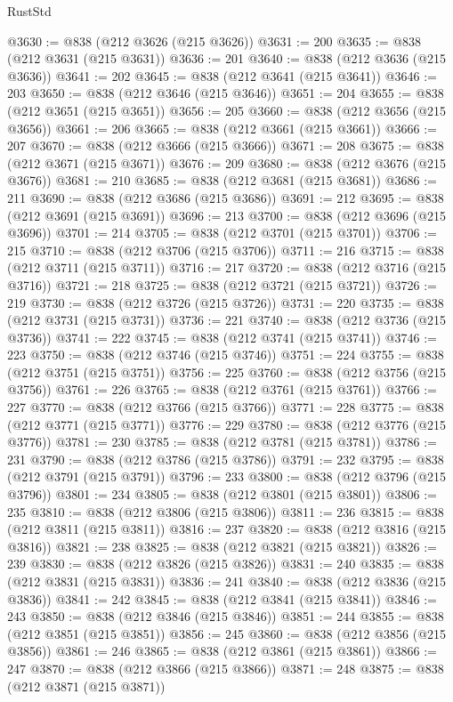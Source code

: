 \begin{lexlean}{RustStd}
\begin{coremodule}
@3630 := @838 (@212 @3626 (@215 @3626))
@3631 := 200
@3635 := @838 (@212 @3631 (@215 @3631))
@3636 := 201
@3640 := @838 (@212 @3636 (@215 @3636))
@3641 := 202
@3645 := @838 (@212 @3641 (@215 @3641))
@3646 := 203
@3650 := @838 (@212 @3646 (@215 @3646))
@3651 := 204
@3655 := @838 (@212 @3651 (@215 @3651))
@3656 := 205
@3660 := @838 (@212 @3656 (@215 @3656))
@3661 := 206
@3665 := @838 (@212 @3661 (@215 @3661))
@3666 := 207
@3670 := @838 (@212 @3666 (@215 @3666))
@3671 := 208
@3675 := @838 (@212 @3671 (@215 @3671))
@3676 := 209
@3680 := @838 (@212 @3676 (@215 @3676))
@3681 := 210
@3685 := @838 (@212 @3681 (@215 @3681))
@3686 := 211
@3690 := @838 (@212 @3686 (@215 @3686))
@3691 := 212
@3695 := @838 (@212 @3691 (@215 @3691))
@3696 := 213
@3700 := @838 (@212 @3696 (@215 @3696))
@3701 := 214
@3705 := @838 (@212 @3701 (@215 @3701))
@3706 := 215
@3710 := @838 (@212 @3706 (@215 @3706))
@3711 := 216
@3715 := @838 (@212 @3711 (@215 @3711))
@3716 := 217
@3720 := @838 (@212 @3716 (@215 @3716))
@3721 := 218
@3725 := @838 (@212 @3721 (@215 @3721))
@3726 := 219
@3730 := @838 (@212 @3726 (@215 @3726))
@3731 := 220
@3735 := @838 (@212 @3731 (@215 @3731))
@3736 := 221
@3740 := @838 (@212 @3736 (@215 @3736))
@3741 := 222
@3745 := @838 (@212 @3741 (@215 @3741))
@3746 := 223
@3750 := @838 (@212 @3746 (@215 @3746))
@3751 := 224
@3755 := @838 (@212 @3751 (@215 @3751))
@3756 := 225
@3760 := @838 (@212 @3756 (@215 @3756))
@3761 := 226
@3765 := @838 (@212 @3761 (@215 @3761))
@3766 := 227
@3770 := @838 (@212 @3766 (@215 @3766))
@3771 := 228
@3775 := @838 (@212 @3771 (@215 @3771))
@3776 := 229
@3780 := @838 (@212 @3776 (@215 @3776))
@3781 := 230
@3785 := @838 (@212 @3781 (@215 @3781))
@3786 := 231
@3790 := @838 (@212 @3786 (@215 @3786))
@3791 := 232
@3795 := @838 (@212 @3791 (@215 @3791))
@3796 := 233
@3800 := @838 (@212 @3796 (@215 @3796))
@3801 := 234
@3805 := @838 (@212 @3801 (@215 @3801))
@3806 := 235
@3810 := @838 (@212 @3806 (@215 @3806))
@3811 := 236
@3815 := @838 (@212 @3811 (@215 @3811))
@3816 := 237
@3820 := @838 (@212 @3816 (@215 @3816))
@3821 := 238
@3825 := @838 (@212 @3821 (@215 @3821))
@3826 := 239
@3830 := @838 (@212 @3826 (@215 @3826))
@3831 := 240
@3835 := @838 (@212 @3831 (@215 @3831))
@3836 := 241
@3840 := @838 (@212 @3836 (@215 @3836))
@3841 := 242
@3845 := @838 (@212 @3841 (@215 @3841))
@3846 := 243
@3850 := @838 (@212 @3846 (@215 @3846))
@3851 := 244
@3855 := @838 (@212 @3851 (@215 @3851))
@3856 := 245
@3860 := @838 (@212 @3856 (@215 @3856))
@3861 := 246
@3865 := @838 (@212 @3861 (@215 @3861))
@3866 := 247
@3870 := @838 (@212 @3866 (@215 @3866))
@3871 := 248
@3875 := @838 (@212 @3871 (@215 @3871))

\end{coremodule}
\end{lexlean}
